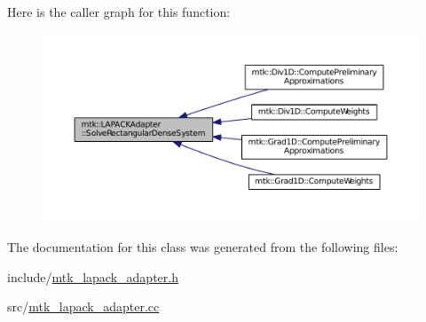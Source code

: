 Here is the caller graph for this function\-:\nopagebreak
\begin{figure}[H]
\begin{center}
\leavevmode
\includegraphics[width=350pt]{classmtk_1_1LAPACKAdapter_a380f148ffdf96bae2f79ae28f1a6560c_icgraph}
\end{center}
\end{figure}




The documentation for this class was generated from the following files\-:\begin{DoxyCompactItemize}
\item 
include/\hyperlink{mtk__lapack__adapter_8h}{mtk\-\_\-lapack\-\_\-adapter.\-h}\item 
src/\hyperlink{mtk__lapack__adapter_8cc}{mtk\-\_\-lapack\-\_\-adapter.\-cc}\end{DoxyCompactItemize}
